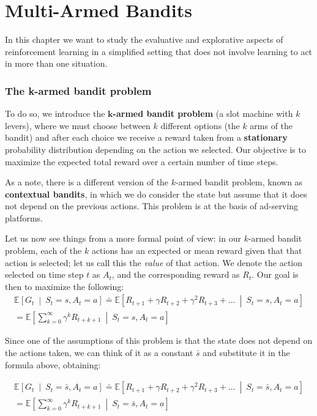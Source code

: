 \section{Multi-Armed Bandits}
In this chapter we want to study the evaluative and explorative aspects of reinforcement learning in a simplified setting that does not involve learning to act in more than one situation.

\subsubsection{The k-armed bandit problem}
To do so, we introduce the \textbf{$\boldsymbol{k}$-armed bandit problem} (a slot machine with $k$ levers), where we must choose between $k$ different options (the $k$ arms of the bandit) and after each choice we receive a reward taken from a \textbf{stationary} probability distribution depending on the action we selected. Our objective is to maximize the expected total reward over a certain number of time steps.

As a note, there is a different version of the $k$-armed bandit problem, known as \textbf{contextual bandits}, in which we do consider the state but assume that it does not depend on the previous actions. This problem is at the basis of ad-serving platforms.

Let us now see things from a more formal point of view: in our $k$-armed bandit problem, each of the $k$ actions has an expected or mean reward given that that action is selected; let us call this the \textit{value} of that action. We denote the action selected on time step $t$ as $A_t$, and the corresponding reward as $R_t$. Our goal is then to maximize the following:
\begin{gather*}
    \mathbb{E} \left[ G_t \  \middle\vert \  S_t = s, A_t = a \right] \doteq \mathbb{E} \left[ R_{t+1} + \gamma R_{t+2} + \gamma^2 R_{t+3} + ... \  \middle\vert \  S_t = s, A_t = a \right] \\
    = \mathbb{E} \left[ \sum_{k=0}^{\infty} \gamma^k R_{t+k+1} \  \middle\vert \  S_t = s, A_t = a \right]
\end{gather*}

Since one of the assumptions of this problem is that the state does not depend on the actions taken, we can think of it as a constant $\bar{s}$ and substitute it in the formula above, obtaining:

\begin{gather*}
    \mathbb{E} \left[ G_t \  \middle\vert \  S_t = \bar{s}, A_t = a \right] \doteq \mathbb{E} \left[ R_{t+1} + \gamma R_{t+2} + \gamma^2 R_{t+3} + ... \  \middle\vert \  S_t = \bar{s}, A_t = a \right] \\
    = \mathbb{E} \left[ \sum_{k=0}^{\infty} \gamma^k R_{t+k+1} \  \middle\vert \  S_t = \bar{s}, A_t = a \right]
\end{gather*}

